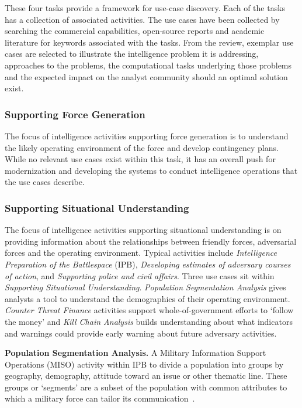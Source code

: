 These four tasks provide a framework for use-case discovery. 
Each of the tasks has a collection of associated activities.
The use cases have been collected by searching the commercial capabilities, open-source reports and academic literature for keywords associated with the tasks.
From the review, exemplar use cases are selected to illustrate the intelligence problem it is addressing, approaches to the problems, the computational tasks underlying those problems and the expected impact on the analyst community should an optimal solution exist.

\subsubsection{Supporting Force Generation}
\label{section:Supporting-Force-Generation}
The focus of intelligence activities supporting force generation is to understand the likely operating environment of the force and develop contingency plans. 
While no relevant use cases exist within this task, it has an overall push for modernization and developing the systems to conduct intelligence operations that the use cases describe.

\subsubsection{Supporting Situational Understanding}
\label{section:Supporting-Situational-Understanding}
The focus of intelligence activities supporting situational understanding is on providing information about the relationships between friendly forces, adversarial forces and the operating environment. 
Typical activities include \textit{Intelligence Preparation of the Battlespace} (IPB), \textit{Developing estimates of adversary courses of action}, and \textit{Supporting police and civil affairs}.
Three use cases sit within \textit{Supporting Situational Understanding}.
\textit{Population Segmentation Analysis} gives analysts a tool to understand the demographics of their operating environment.
\textit{Counter Threat Finance} activities support whole-of-government efforts to `follow the money' and \textit{Kill Chain Analysis} builds understanding about what indicators and warnings could provide early warning about future adversary activities.

\textbf{Population Segmentation Analysis.}
A Military Information Support Operations (MISO) activity within IPB to divide a population into groups by geography, demography, attitude toward an issue or other thematic line.
These groups or `segments' are a subset of the population with common attributes to which a military force can tailor its communication~\cite{Army2023}.

